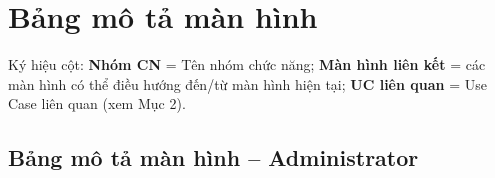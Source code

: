 \documentclass[11pt,a4paper]{article}
\begin{document}
	\section{Bảng mô tả màn hình}
	
	Ký hiệu cột: \textbf{Nhóm CN} = Tên nhóm chức năng; \textbf{Màn hình liên kết} = các màn hình có
	thể điều hướng đến/từ màn hình hiện tại; \textbf{UC liên quan} = Use Case liên quan (xem Mục 2).
	
	\subsection{Bảng mô tả màn hình – Administrator}
	
\end{document}
